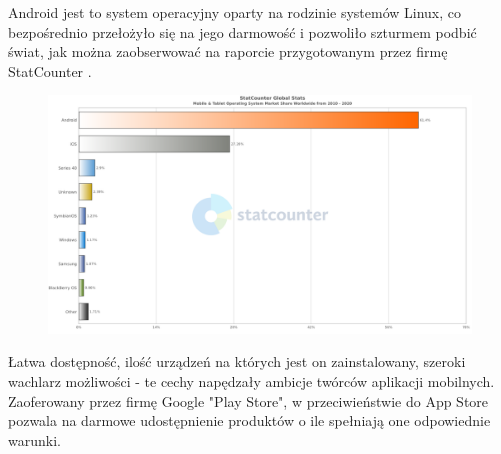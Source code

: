 \documentclass[12pt, a4paper]{article}
\begin{document}
\begin{sloppypar}
{{    Android jest to system operacyjny oparty na rodzinie systemów Linux, co bezpośrednio
    przełożyło się na jego darmowość i pozwoliło szturmem podbić świat, jak można
    zaobserwować na raporcie przygotowanym przez firmę StatCounter \cite{os}.
    \begin{figure}[H]
      \centering
      \includegraphics[width=.9\textwidth]{android_chart.png}
      \label{fig:android}
    \end{figure}
    Łatwa dostępność, ilość urządzeń na których jest on zainstalowany, szeroki wachlarz
    możliwości - te cechy napędzały ambicje twórców aplikacji mobilnych. Zaoferowany
    przez firmę Google "Play Store", w przeciwieństwie do App Store pozwala na darmowe
    udostępnienie produktów o ile spełniają one odpowiednie warunki.

}}
\end{sloppypar}
\end{document}
